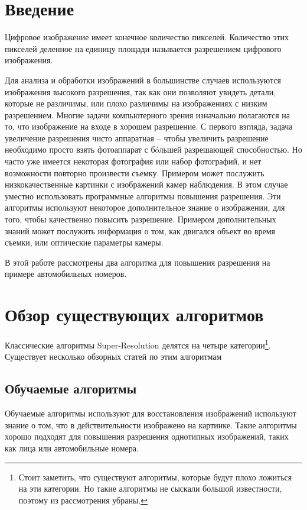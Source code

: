 \section{Введение}
Цифровое изображение имеет конечное количество пикселей. Количество этих пикселей деленное на единицу площади называется
разрешением цифрового изображения.

Для анализа и обработки изображений в большинстве случаев используются изображения высокого разрешения, так как они
позволяют увидеть детали, которые не различимы, или плохо различимы на изображениях с низким разрешением. Многие задачи
компьютерного зрения изначально полагаются на то, что изображение на входе в хорошем разрешение. С первого взгляда,
задача увеличение разрешения чисто аппаратная -- чтобы увеличить разрешение необходимо просто взять фотоаппарат с
б\'oльшей разрешающей способностью. Но часто уже имеется некоторая фотография или набор фотографий, и нет возможности
повторно произвести съемку. Примером может послужить низкокачественные картинки с изображений камер наблюдения. В этом
случае уместно использовать программные алгоритмы повышения разрешения. Эти алгоритмы используют некоторое
дополнительное знание о изображении, для того, чтобы качественно повысить разрешение. Примером дополнительных знаний
может послужить информация о том, как двигался объект во время съемки, или оптические параметры камеры.

В этой работе рассмотрены два алгоритма для повышения разрешения на примере автомобильных номеров.

\section{Обзор существующих алгоритмов} Классические алгоритмы Super-Resolution делятся на четыре
категории\footnote{Стоит заметить, что существуют алгоритмы, которые будут плохо ложиться на эти категории. Но такие
алгоритмы не сыскали большой известности, поэтому из рассмотрения убраны.}.  Существует несколько обзорных статей по
этим алгоритмам \cite{ParkS.C.2003,tian2011survey}

\subsection{Обучаемые алгоритмы}
Обучаемые алгоритмы используют для восстановления изображений используют знание о том,
что в действительности изображено на картинке. Такие алгоритмы хорошо подходят для повышения разрешения однотипных
изображений, таких как лица или автомобильные номера.

